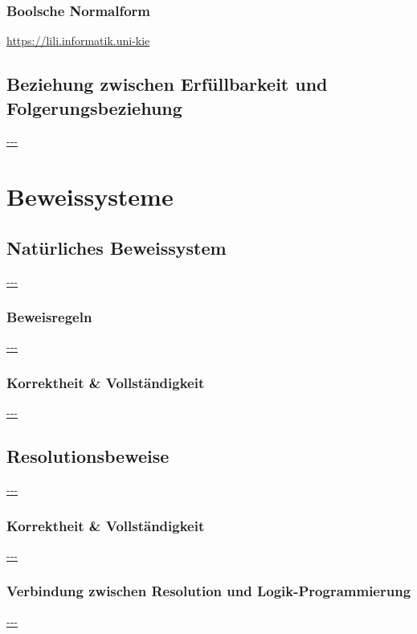 \documentclass[twocolumn]{article}
\begin{document}
    \subsubsection{Boolsche Normalform}
    \url{https://lili.informatik.uni-kie}\\

    \subsection{Beziehung zwischen Erfüllbarkeit und Folgerungsbeziehung}
    \url{---}\\

    \section{Beweissysteme}

    \subsection{Natürliches Beweissystem}
    \url{---}\\

    \subsubsection{Beweisregeln}
    \url{---}\\

    \subsubsection{Korrektheit \& Vollständigkeit}
    \url{---}\\

    \subsection{Resolutionsbeweise}
    \url{---}\\

    \subsubsection{Korrektheit \& Vollständigkeit}
    \url{---}\\

    \subsubsection{Verbindung zwischen Resolution und Logik-Programmierung}
    \url{---}\\
\end{document}
